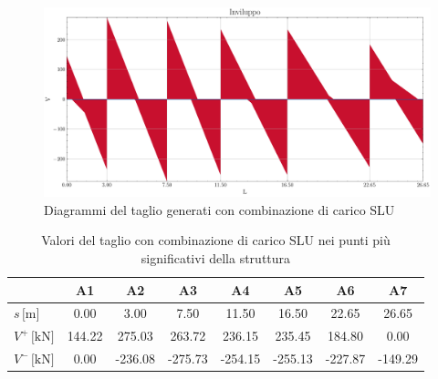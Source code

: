 \begin{landscape}
\begin{table}[H]
\begin{tabular}
		\bottomrule
	\end{tabular}
\end{table}
\clearpage
\begin{figure}[H]
	\centering
	\includegraphics[height=0.6\textwidth]{IMG/diagrammi_trave/ULS_V.pdf}
	\caption{Diagrammi del taglio generati con combinazione di carico SLU}
	\label{fig:trave_ULS_taglio}
	\end{figure}
	\begin{table}[H]
	\footnotesize
	\centering
	\caption{Valori del taglio con combinazione di carico SLU nei punti più significativi della struttura}
	\label{tab:trave_ULS_taglio}
		\begin{tabular}{lS[table-format=-3.2]S[table-format=-3.2]S[table-format=-3.2]S[table-format=-3.2]S[table-format=-3.2]S[table-format=-3.2]S[table-format=-3.2]}
			\toprule
			{}                           & {A1}   & {A2}    & {A3}    & {A4}    & {A5}    & {A6}    & {A7} \\
			\midrule
			$s\,\si{[\metre]}$			 & 0.00   & 3.00    & 7.50    & 11.50   & 16.50   & 22.65   & 26.65 \\
			$V^{+}\,\si{[\kilo\newton]}$ & 144.22 & 275.03  & 263.72  & 236.15  & 235.45  & 184.80  & 0.00 \\
			$V^{-}\,\si{[\kilo\newton]}$ & 0.00   & -236.08 & -275.73 & -254.15 & -255.13 & -227.87 & -149.29 \\
			\bottomrule
		\end{tabular}
	\end{table}
\clearpage

\end{landscape}
